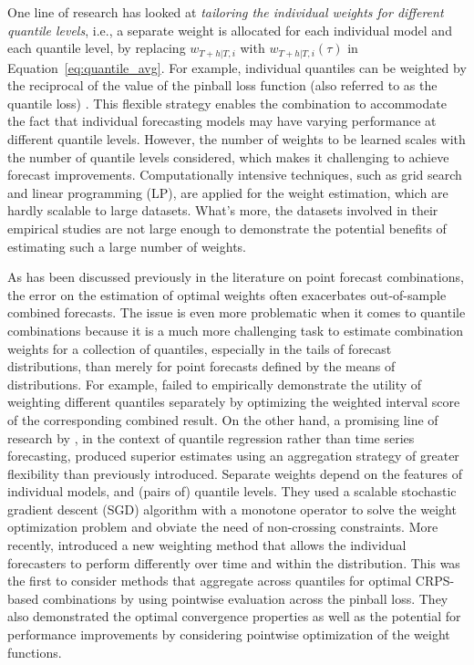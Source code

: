 \documentclass[a4paper,11pt]{article}
\begin{document}
One line of research has looked at \textit{tailoring the individual weights for different quantile levels}, i.e., a separate weight is allocated for each individual model and each quantile level, by replacing $w_{T+h|T,i}$ with $w_{T+h|T,i}(\tau)$ in Equation~\eqref{eq:quantile_avg}. For example, individual quantiles can be weighted by the reciprocal of the value of the pinball loss function (also referred to as the quantile loss) \citep{Wang2019-lx,Zhang2020-dm,Browell2020-pa}. This flexible strategy enables the combination to accommodate the fact that individual forecasting models may have varying performance at different quantile levels. However, the number of weights to be learned scales with the number of quantile levels considered, which makes it challenging to achieve forecast improvements. Computationally intensive techniques, such as grid search and linear programming (LP), are applied for the weight estimation, which are hardly scalable to large datasets. What's more, the datasets involved in their empirical studies are not large enough to demonstrate the potential benefits of estimating such a large number of weights.

As has been discussed previously in the literature on point forecast combinations, the error on the estimation of optimal weights often exacerbates out-of-sample combined forecasts. The issue is even more problematic when it comes to quantile combinations because it is a much more challenging task to estimate combination weights for a collection of quantiles, especially in the tails of forecast distributions, than merely for point forecasts defined by the means of distributions. For example, \citet{Ray2022-co} failed to empirically demonstrate the utility of weighting different quantiles separately by optimizing the weighted interval score \citep[WIS,][]{Bracher2021-hx} of the corresponding combined result. On the other hand, a promising line of research by \citet{Kim2021-wa}, in the context of quantile regression rather than time series forecasting, produced superior estimates using an aggregation strategy of greater flexibility than previously introduced. Separate weights depend on the features of individual models, and (pairs of) quantile levels. They used a scalable stochastic gradient descent (SGD) algorithm with a monotone operator to solve the weight optimization problem and obviate the need of non-crossing constraints. More recently, \citet{Berrisch2021-cr} introduced a new weighting method that allows the individual forecasters to perform differently over time and within the distribution. This was the first to consider methods that aggregate across quantiles for optimal CRPS-based combinations by using pointwise evaluation across the pinball loss. They also demonstrated the optimal convergence properties as well as the potential for performance improvements by considering pointwise optimization of the weight functions.
\end{document}
